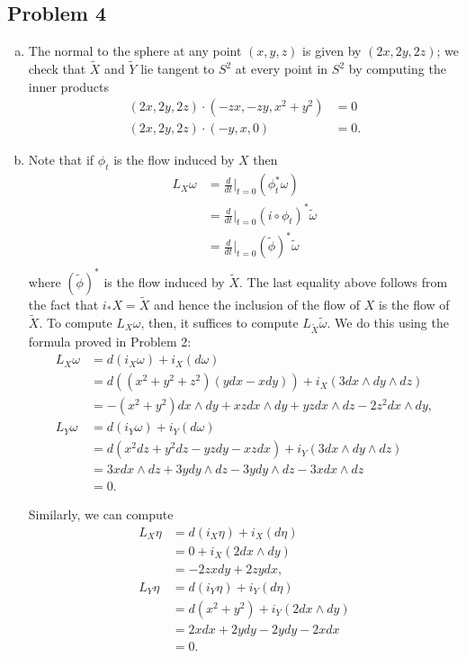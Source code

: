 \documentclass{../mathnotes}
\begin{document}
\subsection*{Problem 4}
\begin{enumerate}[(a)]
    \item The normal to the sphere at any point $(x,y,z)$ is given by $(2x,2y,2z)$; we check
        that $\tilde X$ and $\tilde Y$ lie tangent to $S^2$ at every point in $S^2$ by
        computing the inner products
        \begin{align*}
            (2x,2y,2z)\cdot (-zx,-zy,x^2+y^2) &= 0\\
            (2x,2y,2z)\cdot (-y,x,0) &= 0.
        \end{align*}
    \item Note that if $\phi_t$ is the flow induced by $X$ then
        \begin{align*}
            L_X\omega &= \frac{d}{dt}\bigg|_{t=0}(\phi_t^*\omega)\\
            &= \frac{d}{dt}\bigg|_{t=0}(i\circ\phi_t)^*\tilde\omega\\
            &= \frac{d}{dt}\bigg|_{t=0}(\tilde \phi)^*\tilde\omega\\
        \end{align*}
        where $(\tilde \phi)^*$ is the flow induced by $\tilde X$. The last equality above follows
        from the fact that $i_*X=\tilde X$ and hence the inclusion of the flow of $X$ is the flow
        of $\tilde X$. To compute $L_X\omega$, then, it suffices to compute $L_{\tilde X}\tilde\omega$.
        We do this using the formula proved in Problem 2:
        \begin{align*}
            L_X\omega &= d(i_X\omega)+i_X(d\omega)\\
            &= d( (x^2+y^2+z^2)(ydx-xdy)) +i_X(3dx\wedge dy\wedge dz)\\
            &= -(x^2+y^2)dx\wedge dy+xzdx\wedge dy+yzdx\wedge dz-2z^2dx\wedge dy,\\
            L_Y\omega &= d(i_Y\omega)+i_Y(d\omega)\\
            &= d(x^2dz+y^2dz-yzdy-xzdx)+i_Y(3dx\wedge dy\wedge dz)\\
            &= 3xdx\wedge dz+3ydy\wedge dz-3ydy\wedge dz-3xdx\wedge dz\\
            &=0.
        \end{align*}

        Similarly, we can compute
        \begin{align*}
            L_X\eta &= d(i_X\eta)+i_X(d\eta)\\
            &= 0 + i_X(2dx\wedge dy)\\
            &= -2zx dy + 2zy dx,\\
            L_Y\eta &= d(i_Y\eta)+i_Y(d\eta)\\
            &= d(x^2+y^2)+i_Y(2dx\wedge dy)\\
            &= 2xdx+2ydy-2ydy-2xdx\\
            &= 0.
        \end{align*}


\end{enumerate}
\end{document}

